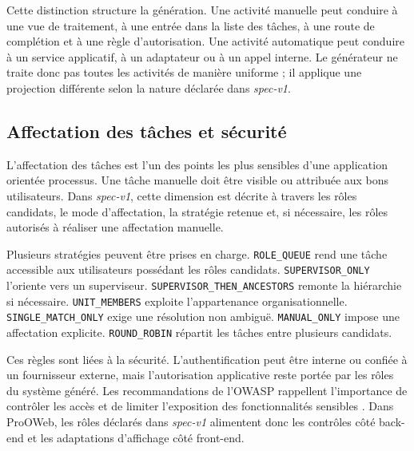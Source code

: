 Cette distinction structure la génération. Une activité manuelle peut conduire à une vue de traitement, à une entrée dans la liste des tâches, à une route de complétion et à une règle d'autorisation. Une activité automatique peut conduire à un service applicatif, à un adaptateur ou à un appel interne. Le générateur ne traite donc pas toutes les activités de manière uniforme ; il applique une projection différente selon la nature déclarée dans \textit{spec-v1}.

\subsection{Affectation des tâches et sécurité}

L'affectation des tâches est l'un des points les plus sensibles d'une application orientée processus. Une tâche manuelle doit être visible ou attribuée aux bons utilisateurs. Dans \textit{spec-v1}, cette dimension est décrite à travers les rôles candidats, le mode d'affectation, la stratégie retenue et, si nécessaire, les rôles autorisés à réaliser une affectation manuelle.

Plusieurs stratégies peuvent être prises en charge. \texttt{ROLE\_QUEUE} rend une tâche accessible aux utilisateurs possédant les rôles candidats. \texttt{SUPERVISOR\_ONLY} l'oriente vers un superviseur. \texttt{SUPERVISOR\_THEN\_ANCESTORS} remonte la hiérarchie si nécessaire. \texttt{UNIT\_MEMBERS} exploite l'appartenance organisationnelle. \texttt{SINGLE\_MATCH\_ONLY} exige une résolution non ambiguë. \texttt{MANUAL\_ONLY} impose une affectation explicite. \texttt{ROUND\_ROBIN} répartit les tâches entre plusieurs candidats.

Ces règles sont liées à la sécurité. L'authentification peut être interne ou confiée à un fournisseur externe, mais l'autorisation applicative reste portée par les rôles du système généré. Les recommandations de l'OWASP rappellent l'importance de contrôler les accès et de limiter l'exposition des fonctionnalités sensibles \cite{owaspTopTen2026}. Dans ProOWeb, les rôles déclarés dans \textit{spec-v1} alimentent donc les contrôles côté back-end et les adaptations d'affichage côté front-end.

